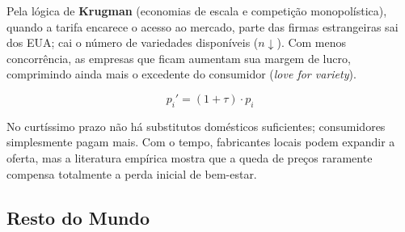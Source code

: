\documentclass[a4paper,12pt]{article}[abntex2]
\begin{document}
Pela lógica de \textbf{Krugman} (economias de escala e competição monopolística), quando a tarifa encarece o acesso ao mercado, parte das firmas estrangeiras sai dos EUA; cai o número de variedades disponíveis ($n\downarrow$). Com menos concorrência, as empresas que ficam aumentam sua margem de lucro, comprimindo ainda mais o excedente do consumidor (\emph{love for variety}).

\begin{equation}
p_i' = (1+\tau) \cdot p_i
\end{equation}

No curtíssimo prazo não há substitutos domésticos suficientes; consumidores simplesmente pagam mais. Com o tempo, fabricantes locais podem expandir a oferta, mas a literatura empírica mostra que a queda de preços raramente compensa totalmente a perda inicial de bem-estar.

\subsection*{\textbf{Resto do Mundo}}
\end{document}
